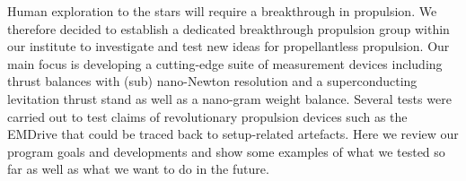 \documentclass[a4paper,parskip,10pt]{scrartcl}
\begin{document}
    \begin{tcolorbox}[
        enhanced,
        title={Keynote Lecture 4: Martin Tajmar (TU Dresden) \\  Overview of Breakthrough Propulsion at TU Dresden},
        sharp corners,
        colbacktitle=thistrack,
        fonttitle=\large\mediumfont,
        boxsep=0pt,
        boxrule=0pt,
        left*=0pt,
        lefttitle=4mm,
        toptitle=4mm,
        bottomtitle=4mm,
        top=0pt,
        bottom=0pt,
        sidebyside,
        sidebyside align=center,
        lefthand width=6cm,
        segmentation empty,
    ]%
        
        \tcblower

        \setlength{\parskip}{1ex}
        
        \vspace{1ex}
        Human exploration to the stars will require a breakthrough in propulsion. We therefore decided to establish a dedicated breakthrough propulsion group within our institute to investigate and test new ideas for propellantless propulsion. Our main focus is developing a cutting-edge suite of measurement devices including thrust balances with (sub) nano-Newton resolution and a superconducting levitation thrust stand as well as a nano-gram weight balance. Several tests were carried out to test claims of revolutionary propulsion devices such as the EMDrive that could be traced back to setup-related artefacts. Here we review our program goals and developments and show some examples of what we tested so far as well as what we want to do in the future.


\end{tcolorbox}
\end{document}
